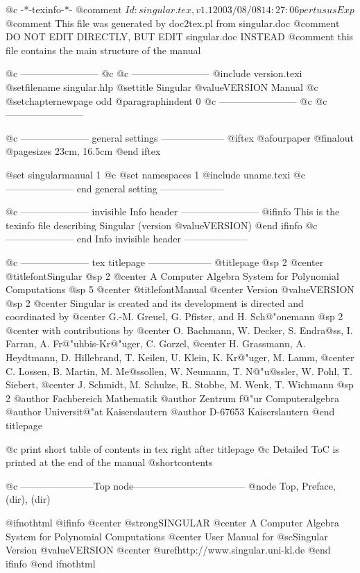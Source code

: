     @c -*-texinfo-*-
@comment $Id: singular.tex,v 1.1 2003/08/08 14:27:06 pertusus Exp $
@comment This file was generated by doc2tex.pl from singular.doc
@comment DO NOT EDIT DIRECTLY, BUT EDIT singular.doc INSTEAD
@comment this file contains the main structure of the manual


@c ------------------------
@c %
@c ------------------------
@include version.texi
@setfilename singular.hlp
@settitle Singular @value{VERSION} Manual
@c @setchapternewpage odd
@paragraphindent 0
@c ------------------------
@c %
@c ------------------------

@c --------------------- general settings --------------------
@iftex
@afourpaper
@finalout
@pagesizes 23cm, 16.5cm
@end iftex

@set singularmanual 1
@c @set namespaces 1
@include uname.texi
@c --------------------- end general setting --------------------


@c --------------------- invisible Info header ------------------------
@ifinfo
This is the texinfo file describing Singular (version @value{VERSION})
@end ifinfo
@c --------------------- end Info invisible header --------------------


@c --------------------- tex titlepage --------------------
@titlepage
@sp 2
@center @titlefont{Singular}
@sp 2
@center A Computer Algebra System for Polynomial Computations
@sp 5
@center @titlefont{Manual}
@center Version @value{VERSION}
@sp 2
@center Singular is created and its development is directed and coordinated by
@center G.-M. Greuel, G. Pfister, and H. Sch@"onemann
@sp 2
@center with contributions by
@center O. Bachmann, W. Decker, S. Endra@ss{}, I. Farran, A. Fr@"uhbis-Kr@"uger, C. Gorzel,
@center H. Grassmann, A. Heydtmann, D. Hillebrand, T. Keilen, U. Klein, K. Kr@"uger, M. Lamm,
@center C. Lossen, B. Martin, M. Me@ss{}ollen, W. Neumann, T. N@"u@ss{}ler, W. Pohl, T. Siebert,
@center J. Schmidt, M. Schulze, R. Stobbe, M. Wenk, T. Wichmann
@sp 2
@author Fachbereich Mathematik
@author Zentrum f@"ur Computeralgebra
@author Universit@"at Kaiserslautern
@author D-67653 Kaiserslautern
@end titlepage

@c print short table of contents in tex right after titlepage
@c Detailed ToC is printed at the end of the manual
@shortcontents

@c -----------------------Top node-----------------------------------
@node Top, Preface, (dir), (dir)

@ifnothtml
@ifinfo
@center @strong{SINGULAR}
@center A Computer Algebra System for Polynomial Computations
@center User Manual for @sc{Singular} Version @value{VERSION}
@center @uref{http://www.singular.uni-kl.de}
@end ifinfo
@end ifnothtml

